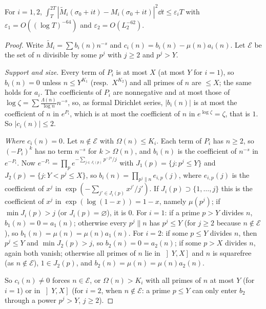 \begin{lemma}\label{lem:mollcoef}
For $i=1,2$, $\int_T^{2T}|\widetilde M_i(\sigma_0+it)-M_i(\sigma_0+it)|^2\dd t\le\varepsilon_iT$ with $\varepsilon_1=O((\log T)^{-64})$ and $\varepsilon_2=O(L_2^{-62})$.
\end{lemma}
\begin{proof}
Write $\widetilde M_i=\sum b_i(n)n^{-s}$ and $c_i(n)=b_i(n)-\mu(n)a_i(n)$. Let $\mathcal E$ be the set of $n$ divisible by some $p^j$ with $j\ge2$ and $p^j>Y$.

\emph{Support and size.} Every term of $P_i$ is at most $X$ (at most $Y$ for $i=1$), so $b_i(n)=0$ unless $n\le Y^{K_1}$ (resp.\ $X^{K_2}$) and all primes of $n$ are $\le X$; the same holds for $a_i$. The coefficients of $P_i$ are nonnegative and at most those of $\log\zeta=\sum\frac{\Lambda(n)}{\log n}n^{-s}$, so, as formal Dirichlet series, $|b_i(n)|$ is at most the coefficient of $n$ in $e^{P_i}$, which is at most the coefficient of $n$ in $e^{\log\zeta}=\zeta$, that is $1$. So $|c_i(n)|\le2$.

\emph{Where $c_i(n)=0$.} Let $n\notin\mathcal E$ with $\Omega(n)\le K_i$. Each term of $P_i$ has $n\ge2$, so $(-P_i)^k$ has no term $n^{-s}$ for $k>\Omega(n)$, and $b_i(n)$ is the coefficient of $n^{-s}$ in $e^{-P_i}$. Now $e^{-P_i}=\prod_pe^{-\sum_{j\in J_i(p)}p^{-js}/j}$ with $J_1(p)=\{j:p^j\le Y\}$ and $J_2(p)=\{j:Y<p^j\le X\}$, so $b_i(n)=\prod_{p^j\parallel n}e_{i,p}(j)$, where $e_{i,p}(j)$ is the coefficient of $x^j$ in $\exp(-\sum_{j'\in J_i(p)}x^{j'}/j')$. If $J_i(p)\supset\{1,\dots,j\}$ this is the coefficient of $x^j$ in $\exp(\log(1-x))=1-x$, namely $\mu(p^j)$; if $\min J_i(p)>j$ (or $J_i(p)=\varnothing$), it is $0$. For $i=1$: if a prime $p>Y$ divides $n$, $b_1(n)=0=a_1(n)$; otherwise every $p^j\parallel n$ has $p^j\le Y$ (for $j\ge2$ because $n\notin\mathcal E$), so $b_1(n)=\mu(n)=\mu(n)a_1(n)$. For $i=2$: if some $p\le Y$ divides $n$, then $p^j\le Y$ and $\min J_2(p)>j$, so $b_2(n)=0=a_2(n)$; if some $p>X$ divides $n$, again both vanish; otherwise all primes of $n$ lie in $\left]Y,X\right]$ and $n$ is squarefree (as $n\notin\mathcal E$), $1\in J_2(p)$, and $b_2(n)=\mu(n)=\mu(n)a_2(n)$.

So $c_i(n)\ne0$ forces $n\in\mathcal E$, or $\Omega(n)>K_i$ with all primes of $n$ at most $Y$ (for $i=1$) or in $\left]Y,X\right]$ (for $i=2$, when $n\notin\mathcal E$: a prime $p\le Y$ can only enter $b_2$ through a power $p^j>Y$, $j\ge2$).


\end{proof}
